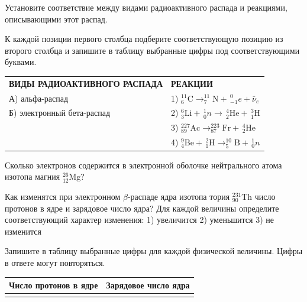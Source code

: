 \begin{taskbasic}[code={\label{task:nuclear_decay_alpha_beta}}]
Установите соответствие между видами радиоактивного распада и реакциями, описывающими этот распад.

К каждой позиции первого столбца подберите соответствующую позицию из второго столбца и запишите в таблицу выбранные цифры под соответствующими буквами.

\smallskip
\begin{tabular}{p{}p{}}
\textbf{ВИДЫ РАДИОАКТИВНОГО РАСПАДА} & \textbf{РЕАКЦИИ} \\
А) альфа-распад & 1) $^{11}_6\text{C} \to ^{11}_7\text{N} + \,^0_{-1}e + \bar{\nu}_e$ \\
Б) электронный бета-распад & 2) $^6_3\text{Li} + \,^1_0 n \to \,^4_2\text{He} + \,^3_1\text{H}$ \\
& 3) $^{227}_{89}\text{Ac} \to ^{223}_{87}\text{Fr} + \,^4_2\text{He}$ \\
& 4) $^9_4\text{Be} + \,^2_1\text{H} \to ^{10}_5\text{B} + \,^1_0 n$
\end{tabular}

\end{taskbasic}

\begin{taskbasic}[code={\label{task:atomic_electrons_magnesium}}]
Сколько электронов содержится в электронной оболочке нейтрального атома изотопа магния $^{26}_{12}\text{Mg}$?

\end{taskbasic}

\begin{taskbasic}[code={\label{task:nuclear_beta_protons_charge}}]
Как изменятся при электронном $\beta$-распаде ядра изотопа тория $^{231}_{90}\text{Th}$ число протонов в ядре и зарядовое число ядра? Для каждой величины определите соответствующий характер изменения:
1) увеличится
2) уменьшится
3) не изменится

Запишите в таблицу выбранные цифры для каждой физической величины. Цифры в ответе могут повторяться.

\nopagebreak\smallskip
\begin{center}
\small
\begin{tabular}{|c|c|}
\hline
Число протонов в ядре & Зарядовое число ядра \\ \hline
 & \\ \hline
\end{tabular}
\end{center}

\end{taskbasic}

